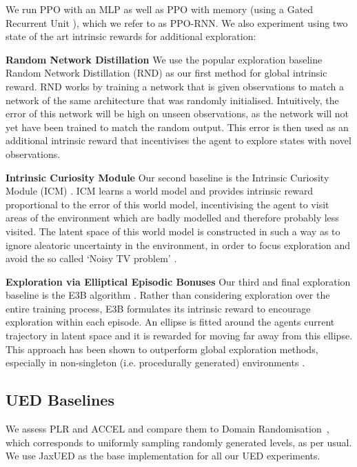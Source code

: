 \documentclass{article}
\theoremstyle{plain}
\theoremstyle{definition}
\theoremstyle{remark}
\begin{document}
We run PPO with an MLP as well as PPO with memory (using a Gated Recurrent Unit \citep{chung2014empirical}), which we refer to as PPO-RNN.  We also experiment using two state of the art intrinsic rewards for additional exploration:

\textbf{Random Network Distillation} We use the popular exploration baseline Random Network Distillation (RND) \citep{rnd2018burda} as our first method for global intrinsic reward.  RND works by training a network that is given observations to match a network of the same architecture that was randomly initialised.  Intuitively, the error of this network will be high on unseen observations, as the network will not yet have been trained to match the random output.  This error is then used as an additional intrinsic reward that incentivises the agent to explore states with novel observations.

\textbf{Intrinsic Curiosity Module} Our second baseline is the Intrinsic Curiosity Module (ICM) \citep{intrinsic2017sukhbaatar}. ICM learns a world model and provides intrinsic reward proportional to the error of this world model, incentivising the agent to visit areas of the environment which are badly modelled and therefore probably less visited.  The latent space of this world model is constructed in such a way as to ignore aleatoric uncertainty in the environment, in order to focus exploration and  avoid the so called `Noisy TV problem' \citep{rnd2018burda}.

\textbf{Exploration via Elliptical Episodic Bonuses} Our third and final exploration baseline is the E3B algorithm \citep{henaff2022exploration}.  Rather than considering exploration over the entire training process, E3B formulates its intrinsic reward to encourage exploration within each episode.  An ellipse is fitted around the agents current trajectory in latent space and it is rewarded for moving far away from this ellipse.  This approach has been shown to outperform global exploration methods, especially in non-singleton (i.e. procedurally generated) environments \citep{henaff2022exploration, henaff2023study}.

\subsection{UED Baselines}

We assess $\text{PLR}$ and ACCEL and compare them to Domain Randomisation~\citep[DR]{jakobi1997Evolutionary,tobin2017Domain}, which corresponds to uniformly sampling randomly generated levels, as per usual.  We use JaxUED \citep{coward2024JaxUED} as the base implementation for all our UED experiments.
\end{document}
